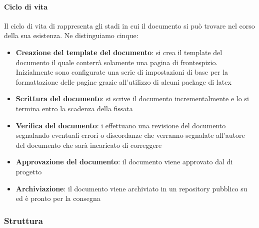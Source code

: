 \documentclass[../norme-di-progetto.tex]{subfiles}
\begin{document}
\paragraph{Ciclo di vita}
Il ciclo di vita di rappresenta gli stadi in cui il documento si può trovare nel corso della sua esistenza. Ne distinguiamo cinque:
\begin{itemize}
	\item \textbf{Creazione del template del documento}: si crea il template del documento il quale conterrà solamente una pagina di frontespizio. Inizialmente sono configurate una serie di impostazioni di base per la formattazione delle pagine grazie all'utilizzo di alcuni package di latex
	\item \textbf{Scrittura del documento}: si scrive il documento incrementalmente e lo si termina entro la scadenza della  fissata
	\item \textbf{Verifica del documento}: i  effettuano una revisione del documento segnalando eventuali errori o discordanze che verranno segnalate all'autore del documento che sarà incaricato di correggere
	\item \textbf{Approvazione del documento}: il documento viene approvato dal  di progetto
	\item \textbf{Archiviazione}: il documento viene archiviato in un repository pubblico su  ed è pronto per la consegna
\end{itemize}
\subsubsection{Struttura}
\end{document}

